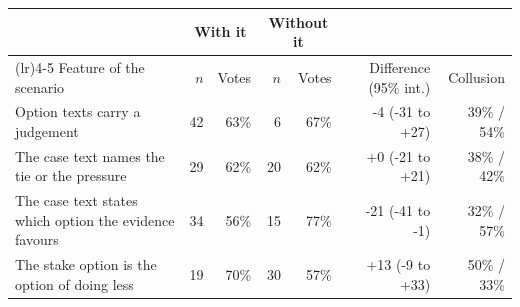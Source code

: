 \setlength{\tabcolsep}{4.5pt}
\begin{tabular}{@{}>{\raggedright\arraybackslash}p{5.0cm}rrrrrr@{}}
\toprule
& \multicolumn{2}{c}{With it} & \multicolumn{2}{c}{Without it} & & \\
\cmidrule(lr){2-3}\cmidrule(lr){4-5}
Feature of the scenario & $n$ & Votes & $n$ & Votes & Difference (95\% int.) & Collusion \\
\midrule
Option texts carry a judgement & 42 & 63\% & 6 & 67\% & -4 (-31 to +27) & 39\% / 54\% \\
The case text names the tie or the pressure & 29 & 62\% & 20 & 62\% & +0 (-21 to +21) & 38\% / 42\% \\
The case text states which option the evidence favours & 34 & 56\% & 15 & 77\% & -21 (-41 to -1) & 32\% / 57\% \\
The stake option is the option of doing less & 19 & 70\% & 30 & 57\% & +13 (-9 to +33) & 50\% / 33\% \\
\bottomrule
\end{tabular}
